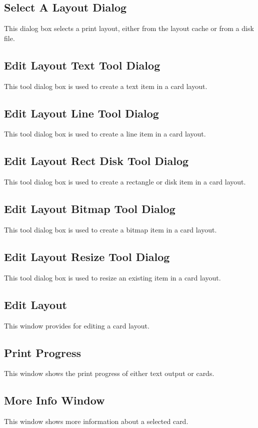 \subsection{Select A Layout Dialog}
This dialog box selects a print layout, either from the layout cache or
from a disk file.
\subsection{Edit Layout Text Tool Dialog}
This tool dialog box is used to create a text item in a card layout.
\subsection{Edit Layout Line Tool Dialog}
This tool dialog box is used to create a line item in a card layout.
\subsection{Edit Layout Rect Disk Tool Dialog}
This tool dialog box is used to create a rectangle or disk item in a
card layout.
\subsection{Edit Layout Bitmap Tool Dialog}
This tool dialog box is used to create a bitmap item in a card layout.
\subsection{Edit Layout Resize Tool Dialog}
This tool dialog box is used to resize an existing item in a card layout.
\subsection{Edit Layout}
This window provides for editing a card layout.
\subsection{Print Progress}
This window shows the print progress of either text output or cards.
\subsection{More Info Window}
This window shows more information about a selected card.


